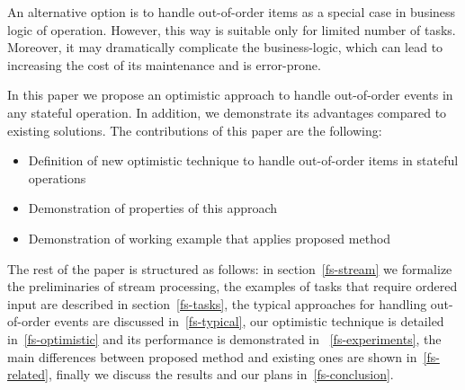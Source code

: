 An alternative option is to handle out-of-order items as a special case in business logic of operation. However, this way is suitable only for limited number of tasks. Moreover, it may dramatically complicate the business-logic, which can lead to increasing the cost of its maintenance and is error-prone.

In this paper we propose an optimistic approach to handle out-of-order events in any stateful operation. In addition, we demonstrate its advantages compared to existing solutions. The contributions of this paper are the following: 

\begin {itemize}
\item Definition of new optimistic technique to handle out-of-order items in stateful operations
\item Demonstration of properties of this approach
\item Demonstration of working example that applies proposed method
\end {itemize}

The rest of the paper is structured as follows: in section~\ref{fs-stream} we formalize the preliminaries of stream processing, the examples of tasks that require ordered input are described in section~\ref{fs-tasks}, the typical approaches for handling out-of-order events are discussed in~\ref{fs-typical}, our optimistic technique is detailed in~\ref{fs-optimistic} and its performance is demonstrated in ~\ref{fs-experiments}, the main differences between proposed method and existing ones are shown in~\ref{fs-related}, finally we discuss the results and our plans in~\ref{fs-conclusion}.

